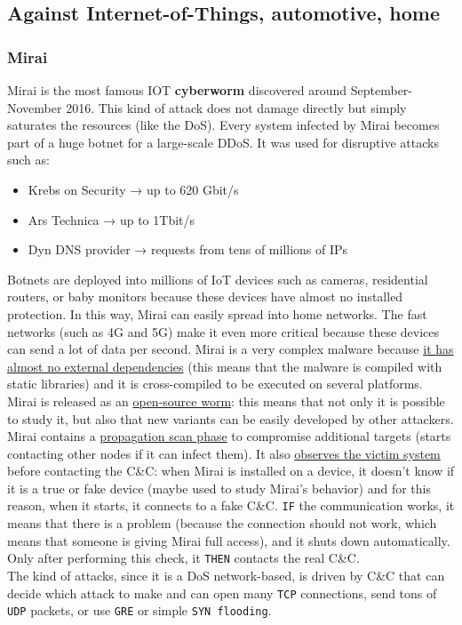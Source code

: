 \subsection{Against Internet-of-Things, automotive, home}

\subsubsection{Mirai}
Mirai is the most famous IOT \textbf{cyberworm} discovered around September-November 2016. This kind of attack does not damage directly but simply saturates the resources (like the DoS). Every system infected by Mirai becomes part of a huge botnet for a large-scale DDoS. It was used for disruptive attacks such as:
\begin{itemize}
  \item Krebs on Security → up to 620 Gbit/s
  \item Ars Technica → up to 1Tbit/s
  \item Dyn DNS provider → requests from tens of millions of IPs
\end{itemize}

Botnets are deployed into millions of IoT devices such as cameras, residential routers, or baby monitors because these devices have almost no installed protection. In this way, Mirai can easily spread into home networks. The fast networks (such as 4G and 5G) make it even more critical because these devices can send a lot of data per second.
Mirai is a very complex malware because \ul{it has almost no external dependencies} (this means that the malware is compiled with static libraries) and it is cross-compiled to be executed on several platforms. Mirai is released as an \ul{open-source worm}: this means that not only it is possible to study it, but also that new variants can be easily developed by other attackers.
Mirai contains a \ul{propagation scan phase} to compromise additional targets (starts contacting other nodes if it can infect them).
It also \ul{observes the victim system} before contacting the C\&C: when Mirai is installed on a device, it doesn't know if it is a true or fake device (maybe used to study Mirai's behavior) and for this reason, when it starts, it connects to a fake C\&C. \texttt{IF} the communication works, it means that there is a problem (because the connection should not work, which means that someone is giving Mirai full access), and it shuts down automatically. Only after performing this check, it \texttt{THEN} contacts the real C\&C.\\
The kind of attacks, since it is a DoS network-based, is driven by C\&C that can decide which attack to make and can open many \texttt{TCP} connections, send tons of \texttt{UDP} packets, or use \texttt{GRE} or simple \texttt{SYN flooding}.

